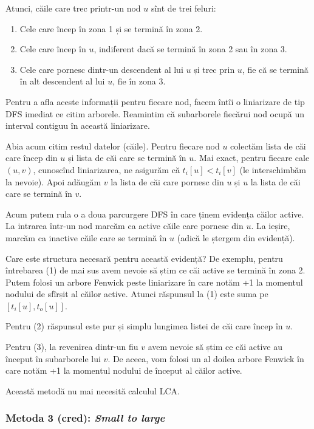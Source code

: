 \documentclass[../main.tex]{subfiles}
\begin{document}
Atunci, căile care trec printr-un nod $u$ sînt de trei feluri:

\begin{enumerate}
  \item Cele care încep în zona 1 și se termină în zona 2.
  \item Cele care încep în $u$, indiferent dacă se termină în zona 2 sau în zona 3.
  \item Cele care pornesc dintr-un descendent al lui $u$ și trec prin $u$, fie că se termină în alt descendent al lui $u$, fie în zona 3.
\end{enumerate}

Pentru a afla aceste informații pentru fiecare nod, facem întîi o liniarizare de tip DFS imediat ce citim arborele. Reamintim că subarborele fiecărui nod ocupă un interval contiguu în această liniarizare.

Abia acum citim restul datelor (căile). Pentru fiecare nod $u$ colectăm lista de căi care încep din $u$ și lista de căi care se termină în $u$. Mai exact, pentru fiecare cale $(u,v)$, cunoscînd liniarizarea, ne asigurăm că $t_i[u] < t_i[v]$ (le interschimbăm la nevoie). Apoi adăugăm $v$ la lista de căi care pornesc din $u$ și $u$ la lista de căi care se termină în $v$.

Acum putem rula o a doua parcurgere DFS în care ținem evidența căilor active. La intrarea într-un nod marcăm ca active căile care pornesc din $u$. La ieșire, marcăm ca inactive căile care se termină în $u$ (adică le ștergem din evidență).

Care este structura necesară pentru această evidență? De exemplu, pentru întrebarea (1) de mai sus avem nevoie să știm ce căi active se termină în zona 2. Putem folosi un arbore Fenwick peste liniarizare în care notăm +1 la momentul nodului de sfîrșit al căilor active. Atunci răspunsul la (1) este suma pe $[t_i[u], t_o[u]]$.

Pentru (2) răspunsul este pur și simplu lungimea listei de căi care încep în $u$.

Pentru (3), la revenirea dintr-un fiu $v$ avem nevoie să știm ce căi active au început în subarborele lui $v$. De aceea, vom folosi un al doilea arbore Fenwick în care notăm +1 la momentul nodului de început al căilor active.

Această metodă nu mai necesită calculul LCA.

\subsubsection*{Metoda 3 (cred): \textit{Small to large}}
\end{document}
